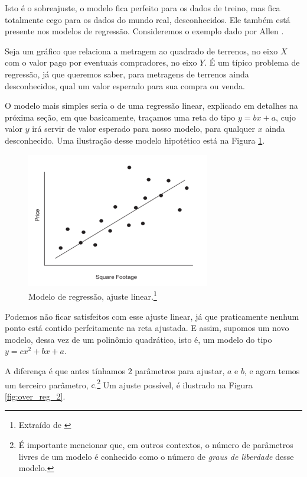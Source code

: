 Isto é o sobreajuste, o modelo fica perfeito para os dados de treino, mas fica totalmente cego para os dados do mundo real, desconhecidos. Ele também está presente nos modelos de regressão. Consideremos o exemplo dado por Allen \citep{allen}.

Seja um gráfico que relaciona a metragem ao quadrado de terrenos, no eixo $X$ com o valor pago por eventuais compradores, no eixo $Y$. É um típico problema de regressão, já que queremos saber, para metragens de terrenos ainda desconhecidos, qual um valor esperado para sua compra ou venda. 

O modelo mais simples seria o de uma regressão linear, explicado em detalhes na próxima seção, em que basicamente, traçamos uma reta do tipo $y = bx + a$, cujo valor $y$ irá servir de valor esperado para nosso modelo, para qualquer $x$ ainda desconhecido. Uma ilustração desse modelo hipotético está na Figura \ref{fig:over_reg_1}.

\begin{figure}[htb]
\centering
\includegraphics[width=8cm]{figuras/over_reg_1}
\caption{Modelo de regressão, ajuste linear.\footnote{Extraído de \citep{allen}}}
\label{fig:over_reg_1}
\end{figure}

Podemos não ficar satisfeitos com esse ajuste linear, já que praticamente nenhum ponto está contido perfeitamente na reta ajustada. E assim, supomos um novo modelo, dessa vez de um polinômio quadrático, isto é, um modelo do tipo $y = cx^2 + bx + a$. 

A diferença é que antes tínhamos $2$ parâmetros para ajustar, $a$ e $b$, e agora temos um terceiro parâmetro, $c$.\footnote{É importante mencionar que, em outros contextos, o número de parâmetros livres de um modelo é conhecido como o número de \emph{graus de liberdade} desse modelo.} Um ajuste possível, é ilustrado na Figura \ref{fig:over_reg_2}.

